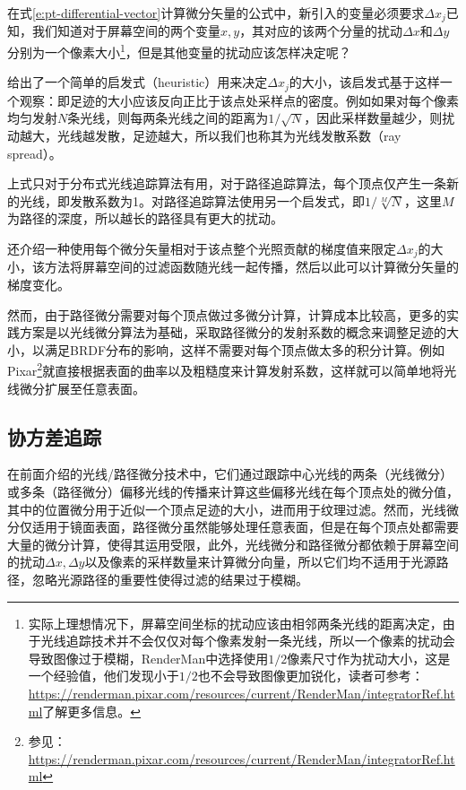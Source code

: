 在式\ref{e:pt-differential-vector}计算微分矢量的公式中，新引入的变量必须要求$\Delta x_j$已知，我们知道对于屏幕空间的两个变量$x,y$，其对应的该两个分量的扰动$\Delta x$和$\Delta y$分别为一个像素大小\footnote{实际上理想情况下，屏幕空间坐标的扰动应该由相邻两条光线的距离决定，由于光线追踪技术并不会仅仅对每个像素发射一条光线，所以一个像素的扰动会导致图像过于模糊，RenderMan中选择使用$1/2$像素尺寸作为扰动大小，这是一个经验值，他们发现小于$1/2$也不会导致图像更加锐化，读者可参考：\url{https://renderman.pixar.com/resources/current/RenderMan/integratorRef.html}了解更多信息。}，但是其他变量的扰动应该怎样决定呢？

\cite{a:Pathdifferentialsandapplications}给出了一个简单的启发式（heuristic）用来决定$\Delta x_j$的大小，该启发式基于这样一个观察：即足迹的大小应该反向正比于该点处采样点的密度。例如如果对每个像素均匀发射$N$条光线，则每两条光线之间的距离为$1/\sqrt{N}$，因此采样数量越少，则扰动越大，光线越发散，足迹越大，所以我们也称其为光线发散系数（ray spread）。

上式只对于分布式光线追踪算法有用，对于路径追踪算法，每个顶点仅产生一条新的光线，即发散系数为1。\cite{a:Pathdifferentialsandapplications}对路径追踪算法使用另一个启发式，即$1/\sqrt[M]{N}$，这里$M$为路径的深度，所以越长的路径具有更大的扰动。


\cite{a:Pathdifferentialsandapplications}还介绍一种使用每个微分矢量相对于该点整个光照贡献的梯度值来限定$\Delta x_j$的大小，该方法将屏幕空间的过滤函数随光线一起传播，然后以此可以计算微分矢量的梯度变化。

然而，由于路径微分需要对每个顶点做过多微分计算，计算成本比较高，更多的实践方案是以光线微分算法为基础，采取路径微分的发射系数的概念来调整足迹的大小，以满足BRDF分布的影响，这样不需要对每个顶点做太多的积分计算。例如Pixar\footnote{参见：\url{https://renderman.pixar.com/resources/current/RenderMan/integratorRef.html}}就直接根据表面的曲率以及粗糙度来计算发射系数，这样就可以简单地将光线微分扩展至任意表面。







\subsection{协方差追踪}\label{sec:pt-covariance-tracing}
在前面介绍的光线/路径微分技术中，它们通过跟踪中心光线的两条（光线微分）或多条（路径微分）偏移光线的传播来计算这些偏移光线在每个顶点处的微分值，其中的位置微分用于近似一个顶点足迹的大小，进而用于纹理过滤。然而，光线微分仅适用于镜面表面，路径微分虽然能够处理任意表面，但是在每个顶点处都需要大量的微分计算，使得其运用受限，此外，光线微分和路径微分都依赖于屏幕空间的扰动$\Delta x,\Delta y$以及像素的采样数量来计算微分向量，所以它们均不适用于光源路径，忽略光源路径的重要性使得过滤的结果过于模糊。

